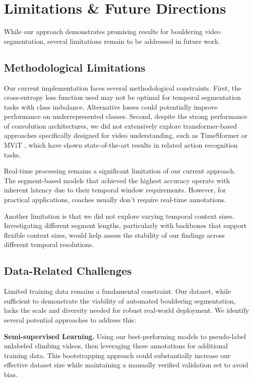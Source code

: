 \section{Limitations \& Future Directions}

While our approach demonstrates promising results for bouldering video segmentation, several limitations remain to be addressed in future work.

\subsection{Methodological Limitations}
Our current implementation faces several methodological constraints. First, the cross-entropy loss function used may not be optimal for temporal segmentation tasks with class imbalance. Alternative losses could potentially improve performance on underrepresented classes. Second, despite the strong performance of convolution architectures, we did not extensively explore transformer-based approaches specifically designed for video understanding, such as TimeSformer \cite{time-s-former} or MViT \cite{mvit}, which have shown state-of-the-art results in related action recognition tasks.

Real-time processing remains a significant limitation of our current approach. The segment-based models that achieved the highest accuracy operate with inherent latency due to their temporal window requirements. However, for practical applications, coaches usually don't require real-time annotations.

Another limitation is that we did not explore varying temporal context sizes. Investigating different segment lengths, particularly with backbones that support flexible context sizes, would help assess the stability of our findings across different temporal resolutions.

\subsection{Data-Related Challenges}
Limited training data remains a fundamental constraint. Our dataset, while sufficient to demonstrate the viability of automated bouldering segmentation, lacks the scale and diversity needed for robust real-world deployment. We identify several potential approaches to address this:

\noindent\textbf{Semi-supervised Learning.}
Using our best-performing models to pseudo-label unlabeled climbing videos, then leveraging these annotations for additional training data. This bootstrapping approach could substantially increase our effective dataset size while maintaining a manually verified validation set to avoid bias.

